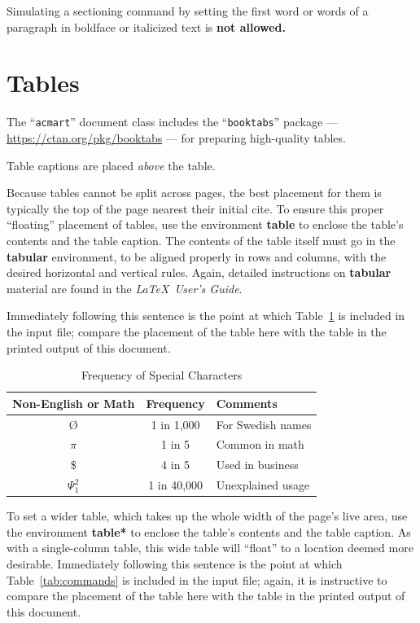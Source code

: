 \documentclass[sigchi]{acmart}
\begin{document}
Simulating a sectioning command by setting the first word or words of
a paragraph in boldface or italicized text is {\bfseries not allowed.}

\section{Tables}

The ``\verb|acmart|'' document class includes the ``\verb|booktabs|''
package --- \url{https://ctan.org/pkg/booktabs} --- for preparing
high-quality tables.

Table captions are placed {\itshape above} the table.

Because tables cannot be split across pages, the best placement for
them is typically the top of the page nearest their initial cite.  To
ensure this proper ``floating'' placement of tables, use the
environment \textbf{table} to enclose the table's contents and the
table caption.  The contents of the table itself must go in the
\textbf{tabular} environment, to be aligned properly in rows and
columns, with the desired horizontal and vertical rules.  Again,
detailed instructions on \textbf{tabular} material are found in the
\textit{\LaTeX\ User's Guide}.

Immediately following this sentence is the point at which
Table~\ref{tab:freq} is included in the input file; compare the
placement of the table here with the table in the printed output of
this document.

\begin{table}
  \caption{Frequency of Special Characters}
  \label{tab:freq}
  \begin{tabular}{ccl}
    \toprule
    Non-English or Math&Frequency&Comments\\
    \midrule
    \O & 1 in 1,000& For Swedish names\\
    $\pi$ & 1 in 5& Common in math\\
    \$ & 4 in 5 & Used in business\\
    $\Psi^2_1$ & 1 in 40,000& Unexplained usage\\
  \bottomrule
\end{tabular}
\end{table}

To set a wider table, which takes up the whole width of the page's
live area, use the environment \textbf{table*} to enclose the table's
contents and the table caption.  As with a single-column table, this
wide table will ``float'' to a location deemed more
desirable. Immediately following this sentence is the point at which
Table~\ref{tab:commands} is included in the input file; again, it is
instructive to compare the placement of the table here with the table
in the printed output of this document.
\end{document}
